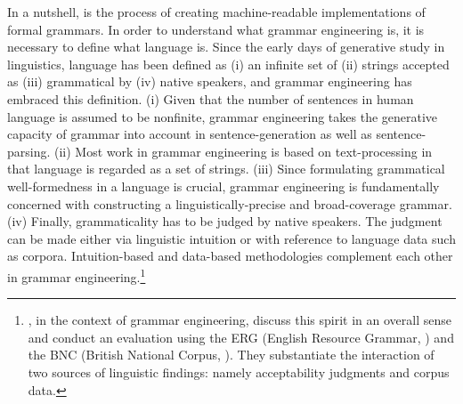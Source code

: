 In a nutshell,  is the process of creating
machine-readable implementations of formal grammars. In order to
understand what grammar engineering is, it is necessary to define what
language is.  Since the early days of generative study in linguistics,
language has been defined as (i) an infinite set of (ii) strings
accepted as (iii) grammatical by (iv) native speakers, and grammar
engineering has embraced this definition.  (i) Given that the number
of sentences in human language is assumed to be nonfinite, grammar
engineering takes the generative capacity of grammar into account in
sentence-generation as well as sentence-parsing. (ii) Most work in
grammar engineering is based on text-processing in that language is
regarded as a set of strings. (iii) Since formulating grammatical
well-formedness in a language is crucial, grammar engineering is
fundamentally concerned with constructing a linguistically-precise and
broad-coverage grammar. (iv) Finally, grammaticality has to be judged
by native speakers. The judgment can be made either via linguistic
intuition or with reference to language data such as corpora.
Intuition-based and data-based methodologies complement each other in
grammar engineering.\footnote{\citet{balwin:etal:05}, in the context
  of grammar engineering, discuss this spirit in an overall sense and
  conduct an evaluation using the ERG (English Resource Grammar,
  \citealt{flickinger:00}) and the BNC (British National Corpus,
  \citealt{burnard:00}). They substantiate the interaction of two
  sources of linguistic findings: namely acceptability judgments and
  corpus data.}




